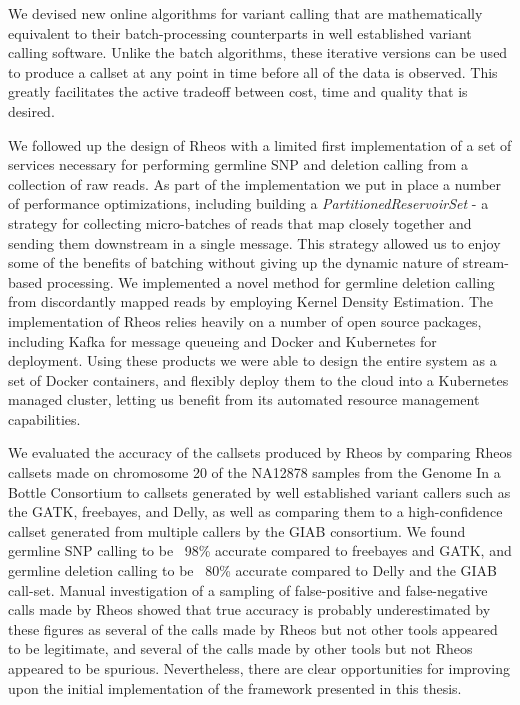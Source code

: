 We devised new online algorithms for variant calling that are mathematically equivalent to their batch-processing counterparts in well established variant calling software. Unlike the batch algorithms, these iterative versions can be used to produce a callset at any point in time before all of the data is observed. This greatly facilitates the active tradeoff between cost, time and quality that is desired. 

We followed up the design of Rheos with a limited first implementation of a set of services necessary for performing germline SNP and deletion calling from a collection of raw reads. As part of the implementation we put in place a number of performance optimizations, including building a \emph{PartitionedReservoirSet} - a strategy for collecting micro-batches of reads that map closely together and sending them downstream in a single message. This strategy allowed us to enjoy some of the benefits of batching without giving up the dynamic nature of stream-based processing. We implemented a novel method for germline deletion calling from discordantly mapped reads by employing Kernel Density Estimation. The implementation of Rheos relies heavily on a number of open source packages, including Kafka for message queueing and Docker and Kubernetes for deployment. Using these products we were able to design the entire system as a set of Docker containers, and flexibly deploy them to the cloud into a Kubernetes managed cluster, letting us benefit from its automated resource management capabilities.

We evaluated the accuracy of the callsets produced by Rheos by comparing Rheos callsets made on chromosome 20 of the NA12878 samples from the Genome In a Bottle Consortium to callsets generated by well established variant callers such as the GATK, freebayes, and Delly, as well as comparing them to a high-confidence callset generated from multiple callers by the GIAB consortium. We found germline SNP calling to be ~98\% accurate compared to freebayes and GATK, and germline deletion calling to be ~80\% accurate compared to Delly and the GIAB call-set. Manual investigation of a sampling of false-positive and false-negative calls made by Rheos showed that true accuracy is probably underestimated by these figures as several of the calls made by Rheos but not other tools appeared to be legitimate, and several of the calls made by other tools but not Rheos appeared to be spurious. Nevertheless, there are clear opportunities for improving upon the initial implementation of the framework presented in this thesis.

